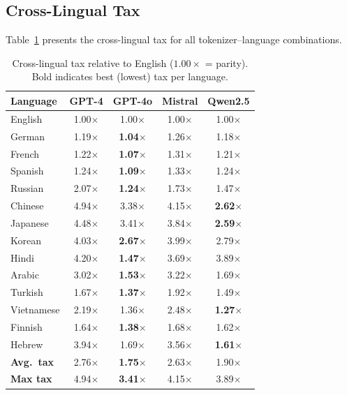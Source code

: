 \documentclass[11pt]{article}
\begin{document}
\subsection{Cross-Lingual Tax}

Table~\ref{tab:tax} presents the cross-lingual tax for all tokenizer--language combinations.

\begin{table}[h]
\centering
\small
\caption{Cross-lingual tax relative to English ($1.00\times$ = parity). Bold indicates best (lowest) tax per language.}
\label{tab:tax}
\begin{tabular}{lcccc}
\toprule
\textbf{Language} & \textbf{GPT-4} & \textbf{GPT-4o} & \textbf{Mistral} & \textbf{Qwen2.5} \\
\midrule
English   & 1.00$\times$ & 1.00$\times$ & 1.00$\times$ & 1.00$\times$ \\
German    & 1.19$\times$ & \textbf{1.04$\times$} & 1.26$\times$ & 1.18$\times$ \\
French    & 1.22$\times$ & \textbf{1.07$\times$} & 1.31$\times$ & 1.21$\times$ \\
Spanish   & 1.24$\times$ & \textbf{1.09$\times$} & 1.33$\times$ & 1.24$\times$ \\
Russian   & 2.07$\times$ & \textbf{1.24$\times$} & 1.73$\times$ & 1.47$\times$ \\
Chinese   & 4.94$\times$ & 3.38$\times$ & 4.15$\times$ & \textbf{2.62$\times$} \\
Japanese  & 4.48$\times$ & 3.41$\times$ & 3.84$\times$ & \textbf{2.59$\times$} \\
Korean    & 4.03$\times$ & \textbf{2.67$\times$} & 3.99$\times$ & 2.79$\times$ \\
Hindi     & 4.20$\times$ & \textbf{1.47$\times$} & 3.69$\times$ & 3.89$\times$ \\
Arabic    & 3.02$\times$ & \textbf{1.53$\times$} & 3.22$\times$ & 1.69$\times$ \\
Turkish   & 1.67$\times$ & \textbf{1.37$\times$} & 1.92$\times$ & 1.49$\times$ \\
Vietnamese& 2.19$\times$ & 1.36$\times$ & 2.48$\times$ & \textbf{1.27$\times$} \\
Finnish   & 1.64$\times$ & \textbf{1.38$\times$} & 1.68$\times$ & 1.62$\times$ \\
Hebrew    & 3.94$\times$ & 1.69$\times$ & 3.56$\times$ & \textbf{1.61$\times$} \\
\midrule
\textbf{Avg.\ tax} & 2.76$\times$ & \textbf{1.75$\times$} & 2.63$\times$ & 1.90$\times$ \\
\textbf{Max tax}   & 4.94$\times$ & \textbf{3.41$\times$} & 4.15$\times$ & 3.89$\times$ \\
\bottomrule
\end{tabular}
\end{table}
\end{document}
